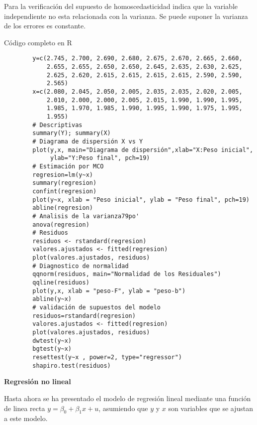 \documentclass[base=hide,12pt]{elegantbook}
\begin{document}
		Para la verificación del supuesto de homoscedasticidad indica que la variable independiente no esta relacionada con la varianza. Se puede suponer la varianza de los errores es constante.
%		
%		
		\newpage
        \begin{Box3}{ Código completo en R}
		\begin{verbatim}
		y=c(2.745, 2.700, 2.690, 2.680, 2.675, 2.670, 2.665, 2.660, 
		    2.655, 2.655, 2.650, 2.650, 2.645, 2.635, 2.630, 2.625, 
		    2.625, 2.620, 2.615, 2.615, 2.615, 2.615, 2.590, 2.590, 
		    2.565)
		x=c(2.080, 2.045, 2.050, 2.005, 2.035, 2.035, 2.020, 2.005, 
		    2.010, 2.000, 2.000, 2.005, 2.015, 1.990, 1.990, 1.995,  
		    1.985, 1.970, 1.985, 1.990, 1.995, 1.990, 1.975, 1.995,  
		    1.955)
		# Descriptivas
		summary(Y); summary(X)
		# Diagrama de dispersión X vs Y
		plot(y,x, main="Diagrama de dispersión",xlab="X:Peso inicial", 
		     ylab="Y:Peso final", pch=19)
		# Estimación por MCO
		regresion=lm(y~x)
		summary(regresion)
		confint(regresion)
		plot(y~x, xlab = "Peso inicial", ylab = "Peso final", pch=19)
		abline(regresion) 
		# Analisis de la varianza79po'
		anova(regresion)
		# Residuos
		residuos <- rstandard(regresion)
		valores.ajustados <- fitted(regresion)
		plot(valores.ajustados, residuos)
		# Diagnostico de normalidad
		qqnorm(residuos, main="Normalidad de los Residuales")
		qqline(residuos)
		plot(y,x, xlab = "peso-F", ylab = "peso-b")
		abline(y~x)
		# validación de supuestos del modelo
		residuos=rstandard(regresion)
		valores.ajustados <- fitted(regresion)
		plot(valores.ajustados, residuos)
		dwtest(y~x)
		bgtest(y~x)
		resettest(y~x , power=2, type="regressor")
		shapiro.test(residuos)
		\end{verbatim}
	   \end{Box3}
   
   
   \newpage		
   \textcolor{col4}{\Large \bf Regresión no lineal} \\
   \vspace{.5cm}
   
   
   Hasta ahora se ha presentado el modelo de regresión lineal mediante una función de linea recta $y= \beta_{0} + \beta_{1} x + u$, asumiendo que $y$ y $x$ son variables que se ajustan a este modelo.
   
\end{document}
